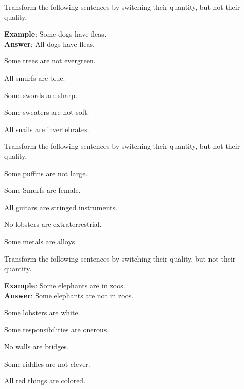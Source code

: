 \noindent\problempart Transform the following sentences by switching their quantity, but not their quality.

\textbf{Example}: Some dogs have fleas. \\
\textbf{Answer}: All dogs have fleas.

\begin{exercises}
\item Some trees are not evergreen. 
\item All smurfs are blue. 
\item Some swords are sharp. 
\item Some sweaters are not soft. 
\item All snails are invertebrates. 
\end{exercises}

\noindent\problempart Transform the following sentences by switching their quantity, but not their quality.

\begin{exercises}
\item Some puffins are not large. 
\item Some Smurfs are female.
\item All guitars are stringed instruments. 
\item No lobsters are extraterrestrial.
\item Some metals are alloys 
\end{exercises}

\noindent\problempart Transform the following sentences by switching their quality, but not their quantity.

\textbf{Example}: Some elephants are in zoos. \\
\textbf{Answer}: Some elephants are not in zoos. 

\begin{exercises}
\item Some lobsters are white. 

\item Some responsibilities are onerous. 

\item No walls are bridges. 

\item Some riddles are not clever.
 
\item All red things are colored. 
\end{exercises}

